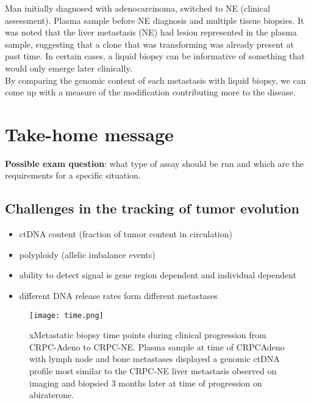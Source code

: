 Man initially diagnosed with adenocarcinoma, switched to NE (clinical assessment). Plasma sample before NE diagnosis and multiple tissue biopsies. It was noted that the liver metastasis (NE) had lesion represented in the plasma sample, suggesting that a clone that was transforming was already present at past time. In certain cases, a liquid biopsy can be informative of something that would only emerge later clinically. \\

By comparing the genomic content of each metastasis with liquid biopsy, we can come up with a measure of the modification contributing more to the disease.


\section{Take-home message}
\textbf{Possible exam question}: what type of assay should be run and which are the requirements for a specific situation.
\subsection{Challenges in the tracking of tumor evolution}
\begin{itemize}
\item ctDNA content (fraction of tumor content in circulation)
\item polyploidy (allelic imbalance events)
\item ability to detect signal is gene region dependent and individual dependent
\item different DNA release rates form different metastases

\end{itemize}
\begin{figure}[H]
\centering
    \texttt{[image: time.png]}
    \caption{xMetastatic biopsy time points during clinical progression
from CRPC-Adeno to CRPC-NE. Plasma sample at time of CRPCAdeno with lymph node and bone metastases displayed a genomic ctDNA profile most similar to the CRPC-NE liver metastasis observed on imaging and biopsied 3 months later at time of progression on abiraterone.}
\label{fig:norm}
\end{figure}


